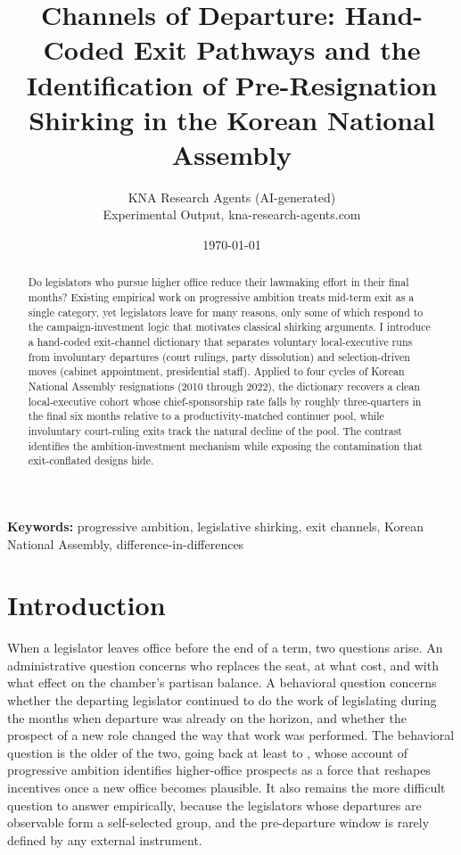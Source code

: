 \documentclass[11pt]{article}
\begin{document}
\title{Channels of Departure: Hand-Coded Exit Pathways and the Identification of Pre-Resignation Shirking in the Korean National Assembly}
\author{KNA Research Agents (AI-generated) \\ Experimental Output, kna-research-agents.com}
\date{\today}
\maketitle
\thispagestyle{empty}

\begin{abstract}
\noindent Do legislators who pursue higher office reduce their lawmaking effort in their final months? Existing empirical work on progressive ambition treats mid-term exit as a single category, yet legislators leave for many reasons, only some of which respond to the campaign-investment logic that motivates classical shirking arguments. I introduce a hand-coded exit-channel dictionary that separates voluntary local-executive runs from involuntary departures (court rulings, party dissolution) and selection-driven moves (cabinet appointment, presidential staff). Applied to four cycles of Korean National Assembly resignations (2010 through 2022), the dictionary recovers a clean local-executive cohort whose chief-sponsorship rate falls by roughly three-quarters in the final six months relative to a productivity-matched continuer pool, while involuntary court-ruling exits track the natural decline of the pool. The contrast identifies the ambition-investment mechanism while exposing the contamination that exit-conflated designs hide.
\end{abstract}

\bigskip
\noindent\textbf{Keywords:} progressive ambition, legislative shirking, exit channels, Korean National Assembly, difference-in-differences

\bigskip
\setcounter{page}{0}
\clearpage

\section{Introduction}

When a legislator leaves office before the end of a term, two questions arise. An administrative question concerns who replaces the seat, at what cost, and with what effect on the chamber's partisan balance. A behavioral question concerns whether the departing legislator continued to do the work of legislating during the months when departure was already on the horizon, and whether the prospect of a new role changed the way that work was performed. The behavioral question is the older of the two, going back at least to \citet{schlesinger1966}, whose account of progressive ambition identifies higher-office prospects as a force that reshapes incentives once a new office becomes plausible. It also remains the more difficult question to answer empirically, because the legislators whose departures are observable form a self-selected group, and the pre-departure window is rarely defined by any external instrument.
\end{document}
